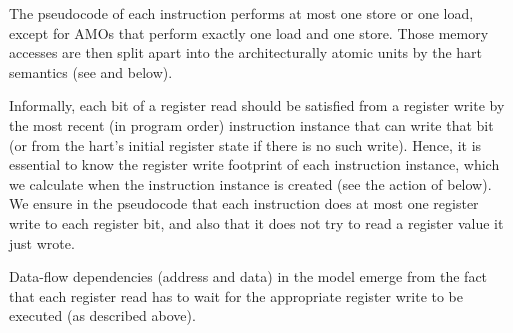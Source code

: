 The pseudocode of each instruction performs at most one store or one load, except for AMOs that perform exactly one load and one store.
Those memory accesses are then split apart into the architecturally atomic units by the hart semantics (see  and  below).

Informally, each bit of a register read should be satisfied from a register write by the most recent (in program order) instruction instance that can write that bit (or from the hart's initial register state if there is no such write).
Hence, it is essential to know the register write footprint of each instruction instance, which we calculate when the instruction instance is created (see the action of  below).
We ensure in the pseudocode that each instruction does at most one register write to each register bit, and also that it does not try to read a register value it just wrote.

Data-flow dependencies (address and data) in the model emerge from the
fact that each register read has to wait for the appropriate register write to be executed (as described above).

